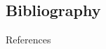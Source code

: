 \documentclass{beamer}
\begin{document}
\subsection{Bibliography}
\begin{frame}[allowframebreaks]{References}
\tiny


\end{frame}
\end{document}
